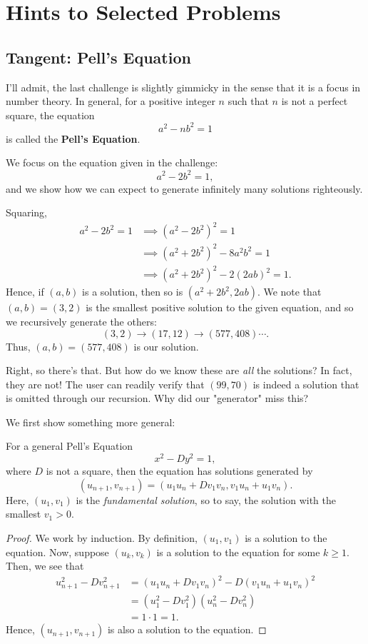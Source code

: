 \documentclass[../jarvis.tex]{subfiles}
\begin{document}
\section{Hints to Selected Problems}
\printhint
\subsection{Tangent: Pell's Equation}
I'll admit, the last challenge is slightly gimmicky in the sense that it is a focus in number theory. In general, for a positive integer $n$ such that $n$ is not a perfect square,
the equation $$a^2-nb^2=1$$
is called the \textbf{Pell's Equation}.

We focus on the equation given in the challenge:
$$a^2-2b^2=1,$$ and we show how we can expect to generate infinitely many solutions righteously.

Squaring,
\begin{align*}
    a^2-2b^2=1&\implies (a^2-2b^2)^2=1 \\
    &\implies (a^2+2b^2)^2-8a^2b^2=1\\
    &\implies (a^2+2b^2)^2-2(2ab)^2=1.
\end{align*}
Hence, if $(a,b)$ is a solution, then so is $(a^2+2b^2,2ab)$. We note that $(a,b)=(3,2)$ is the smallest positive solution to the given equation, and so we recursively generate the others:
$$(3,2)\rightarrow (17,12)\rightarrow (577,408)\cdots.$$
Thus, $(a,b)=(577,408)$ is our solution.

Right, so there's that. But how do we know these are \textit{all} the solutions? In fact, they are not! The user can readily verify that $(99,70)$ is indeed a solution that is omitted through our recursion. Why did our "generator" miss this?

We first show something more general:
\begin{lemma}
    For a general Pell's Equation
    $$x^2-Dy^2=1,$$
    where $D$ is not a square, then the equation has solutions generated by 
    $$(u_{n+1},v_{n+1})=(u_1u_n+Dv_1v_n, v_1u_n+u_1v_n).$$
    Here, $(u_1,v_1)$ is the \textit{fundamental solution}, so to say, the solution with the smallest $v_1>0$.
\end{lemma}
\begin{proof}
    We work by induction. By definition, $(u_1,v_1)$ is a solution to the equation. Now, suppose $(u_k,v_k)$ is a solution to the equation for some $k\geq 1$. Then, we see that
    \begin{align*}
        u_{n+1}^2-Dv_{n+1}^2&=(u_1u_n+Dv_1v_n)^2-D(v_1u_n+u_1v_n)^2 \\
        &=(u_1^2-Dv_1^2)(u_n^2-Dv_n^2) \\
        &=1\cdot1=1.
    \end{align*}
    Hence, $(u_{n+1},v_{n+1})$ is also a solution to the equation.
\end{proof}
\end{document}
